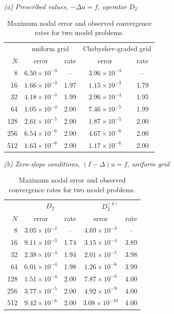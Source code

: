 \documentclass[smallextended,envcountsame]{svjour3}
\begin{document}
\begin{table}[t]\centering\footnotesize
\caption{Maximum nodal error and observed convergence rates for two model problems.}\label{tab:poisson}
\textit{(a) Prescribed values, $-\Delta u=f$, operator $D_2$}\\[2pt]
\begin{tabular}{r cc cc}
\toprule
& \multicolumn{2}{c}{uniform grid} & \multicolumn{2}{c}{Chebyshev-graded grid}\\
$N$ & error & rate & error & rate\\
\midrule
8 & $6.50{\times}10^{-3}$ & -- & $3.96{\times}10^{-3}$ & --\\
16 & $1.66{\times}10^{-3}$ & 1.97 & $1.15{\times}10^{-3}$ & 1.79\\
32 & $4.18{\times}10^{-4}$ & 1.99 & $2.96{\times}10^{-4}$ & 1.95\\
64 & $1.05{\times}10^{-4}$ & 2.00 & $7.46{\times}10^{-5}$ & 1.99\\
128 & $2.61{\times}10^{-5}$ & 2.00 & $1.87{\times}10^{-5}$ & 2.00\\
256 & $6.54{\times}10^{-6}$ & 2.00 & $4.67{\times}10^{-6}$ & 2.00\\
512 & $1.63{\times}10^{-6}$ & 2.00 & $1.17{\times}10^{-6}$ & 2.00\\
\bottomrule
\end{tabular}

\medskip
\textit{(b) Zero-slope conditions, $(I-\Delta)u=f$, uniform grid}\\[2pt]
\begin{tabular}{r cc cc}
\toprule
& \multicolumn{2}{c}{$D_2$} & \multicolumn{2}{c}{$D_2^{(4)}$}\\
$N$ & error & rate & error & rate\\
\midrule
8 & $3.05{\times}10^{-2}$ & -- & $4.69{\times}10^{-3}$ & --\\
16 & $9.11{\times}10^{-3}$ & 1.74 & $3.15{\times}10^{-4}$ & 3.89\\
32 & $2.38{\times}10^{-3}$ & 1.94 & $2.01{\times}10^{-5}$ & 3.98\\
64 & $6.01{\times}10^{-4}$ & 1.98 & $1.26{\times}10^{-6}$ & 3.99\\
128 & $1.51{\times}10^{-4}$ & 2.00 & $7.87{\times}10^{-8}$ & 4.00\\
256 & $3.77{\times}10^{-5}$ & 2.00 & $4.92{\times}10^{-9}$ & 4.00\\
512 & $9.42{\times}10^{-6}$ & 2.00 & $3.08{\times}10^{-10}$ & 4.00\\
\bottomrule
\end{tabular}
\end{table}
\end{document}
